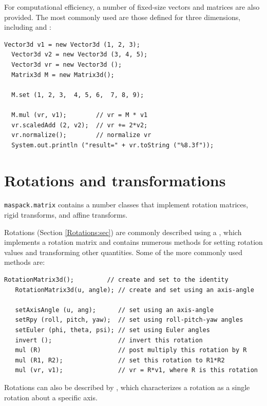 For computational efficiency, a number of fixed-size vectors and
matrices are also provided. The most commonly used are those defined
for three dimensions, including 
and :
%
\begin{lstlisting}[]
  Vector3d v1 = new Vector3d (1, 2, 3);
  Vector3d v2 = new Vector3d (3, 4, 5);
  Vector3d vr = new Vector3d ();
  Matrix3d M = new Matrix3d();

  M.set (1, 2, 3,  4, 5, 6,  7, 8, 9);

  M.mul (vr, v1);        // vr = M * v1
  vr.scaledAdd (2, v2);  // vr += 2*v2;
  vr.normalize();        // normalize vr
  System.out.println ("result=" + vr.toString ("%8.3f"));
\end{lstlisting}
%

\section{Rotations and transformations}
\label{RigidTransform3d:sec}

{\tt maspack.matrix} contains a number classes that implement rotation
matrices, rigid transforms, and affine transforms. 

Rotations (Section \ref{Rotations:sec}) are commonly described using a
, which implements a
rotation matrix and contains numerous methods for setting rotation
values and transforming other quantities. Some of the more commonly
used methods are:
\begin{lstlisting}[]
   RotationMatrix3d();         // create and set to the identity
   RotationMatrix3d(u, angle); // create and set using an axis-angle

   setAxisAngle (u, ang);      // set using an axis-angle
   setRpy (roll, pitch, yaw);  // set using roll-pitch-yaw angles
   setEuler (phi, theta, psi); // set using Euler angles
   invert ();                  // invert this rotation
   mul (R)                     // post multiply this rotation by R
   mul (R1, R2);               // set this rotation to R1*R2
   mul (vr, v1);               // vr = R*v1, where R is this rotation
\end{lstlisting}
%
Rotations can also be described by
, which characterizes a rotation
as a single rotation about a specific axis.


